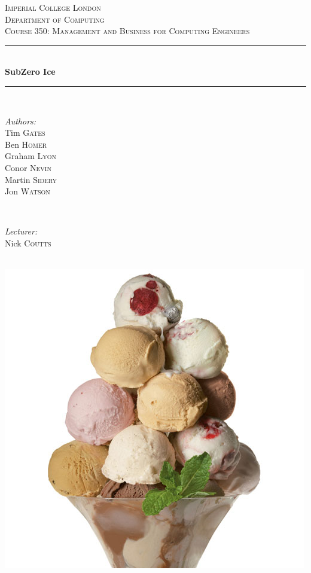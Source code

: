 \documentclass{article}
\begin{document}

\begin{titlepage}
\newcommand{\HRule}{\rule{\linewidth}{0.5mm}}
\center
\textsc{\LARGE Imperial College London}  \\[1.5cm]
\textsc{\Large Department of Computing}  \\[0.5cm]
\textsc{\large Course 350: Management and Business for Computing Engineers} \\[0.5cm]

\HRule \\[0.6cm]
{\huge \bfseries SubZero Ice} \\[0.3cm]
\HRule \\[1.5cm]

\begin{minipage}{0.4\textwidth}

\begin{flushleft} \large \emph{Authors:} \\
Tim       \textsc{Gates}   \\
Ben       \textsc{Homer}   \\
Graham    \textsc{Lyon}    \\
Conor     \textsc{Nevin}   \\
Martin    \textsc{Sidery}  \\
Jon       \textsc{Watson}  \\
\end{flushleft}

\end{minipage}~
\begin{minipage}{0.4\textwidth}

\begin{flushright} \large \emph{Lecturer:} \\
Nick \textsc{Coutts}
\end{flushright}

\end{minipage}\\[2cm]

\includegraphics[scale=0.3]{ice_cream.jpg}


\end{titlepage}
\end{document}
